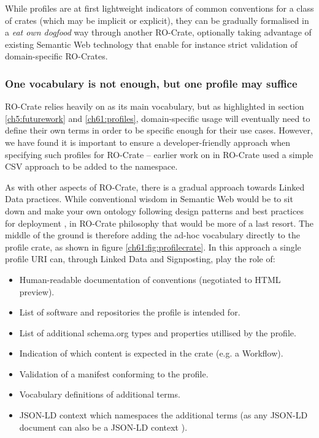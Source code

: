While profiles are at first lightweight indicators of common conventions for a class of crates (which may be implicit or explicit), they can be gradually formalised in a \emph{eat own dogfood} way through another RO-Crate, optionally taking advantage of existing Semantic Web technology that enable for instance strict validation of domain-specific RO-Crates.


\subsubsection{One vocabulary is not enough, but one profile may suffice}
\label{ch61:oneprofile}

RO-Crate relies heavily on \cite{schema.org} as its main vocabulary, but as highlighted in section \vref{ch5:futurework} and \vref{ch61:profiles}, domain-specific usage will eventually need to define their own terms in order to be specific enough for their use cases. However, we have found it is important to ensure a developer-friendly approach when specifying such profiles for RO-Crate -- earlier work on  in RO-Crate used a simple CSV approach to be added to the  namespace.  

As with other aspects of RO-Crate, there is a gradual approach towards Linked Data practices. While conventional wisdom in Semantic Web would be to sit down and make your own ontology following design patterns \cite{Blomquist 2009,Poveda 2010} and best practices for deployment \cite{Matentzoglu 2022}, in RO-Crate philosophy that would be more of a last resort. The middle of the ground is therefore adding the ad-hoc vocabulary directly to the profile crate, as shown in figure \vref{ch61:fig:profilecrate}. In this approach a single profile URI can, through Linked Data and Signposting, play the role of:

\begin{itemize}
  \item Human-readable documentation of conventions (negotiated to HTML preview).
  \item List of software and repositories the profile is intended for.
  \item List of additional schema.org types and properties utillised by the profile.
  \item Indication of which content is expected in the crate (e.g. a Workflow).
  \item Validation of a manifest conforming to the profile.
  \item Vocabulary definitions of additional terms.
  \item JSON-LD context which namespaces the additional terms  (as any JSON-LD document can also be a JSON-LD context \cite{w3-json-ld}).
\end{itemize}

